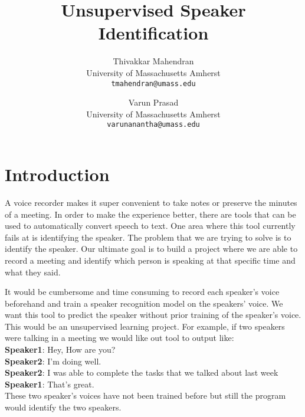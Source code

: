 \documentclass[10pt,twocolumn,letterpaper]{article}
\begin{document}
\title{Unsupervised Speaker Identification}

\author{Thivakkar Mahendran\\
University of Massachusetts Amherst\\
{\tt\small tmahendran@umass.edu}
\and
Varun Prasad\\
University of Massachusetts Amherst\\
{\tt\small varunanantha@umass.edu}
}

\maketitle



\section{Introduction}

A voice recorder makes it super convenient to take notes or preserve the minutes of a meeting. In order to make the experience better, there are tools that can be used to automatically convert speech to text. One area where this tool currently fails at is identifying the speaker. The problem that we are trying to solve is to identify the speaker. Our ultimate goal is to build a project where we are able to record a meeting and identify which person is speaking at that specific time and what they said.

It would be cumbersome and time consuming to record each speaker’s voice beforehand and train a speaker recognition model on the speakers’ voice. We want this tool to predict the speaker without prior training of the speaker’s voice. This would be an unsupervised learning project. \hfill \break \break
For example, if two speakers were talking in a meeting we would like out tool to output like:
\\  {\bf Speaker1}: Hey, How are you? 
\\ {\bf Speaker2}: I’m doing well.
\\ {\bf Speaker2}: I was able to complete the tasks that we talked about last week
\\ {\bf Speaker1}: That’s great.
\\ These two speaker’s voices have not been trained before but still the program would identify the two speakers. 
\end{document}
